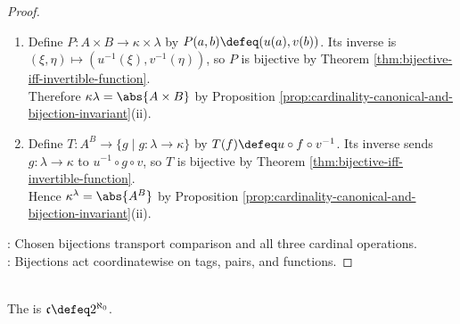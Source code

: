 \begin{proposition}
\begin{proof}
\begin{enumerate}[label=(\roman*)]
Hence $\abs{U}=\abs{V}$ by Proposition \ref{prop:cardinality-canonical-and-bijection-invariant}(ii), proving the first equality.\\
If $A\cap B=\emptyset$, define $G:U\to A\cup B$ by $G(0,a)\defeq a$ and $G(1,b)\defeq b$.\\
Its inverse sends $x\in A$ to $(0,x)$ and $x\in B$ to $(1,x)$, so $G$ is bijective. Thus $\kappa+\lambda=\abs{A\cup B}$ by Proposition \ref{prop:cardinality-canonical-and-bijection-invariant}(ii).
\item[$(iv)$] Define $P:A\times B\to\kappa\times\lambda$ by $P(a,b)\defeq(u(a),v(b))$. Its inverse is $(\xi,\eta)\mapsto(u^{-1}(\xi),v^{-1}(\eta))$, so $P$ is bijective by Theorem \ref{thm:bijective-iff-invertible-function}.\\
Therefore $\kappa\lambda=\abs{A\times B}$ by Proposition \ref{prop:cardinality-canonical-and-bijection-invariant}(ii).
\item[$(v)$] Define $T:A^B\to\{g\mid g:\lambda\to\kappa\}$ by $T(f)\defeq u\circ f\circ v^{-1}$. Its inverse sends $g:\lambda\to\kappa$ to $u^{-1}\circ g\circ v$, so $T$ is bijective by Theorem \ref{thm:bijective-iff-invertible-function}.\\
Hence $\kappa^\lambda=\abs{A^B}$ by Proposition \ref{prop:cardinality-canonical-and-bijection-invariant}(ii).
\end{enumerate}
: Chosen bijections transport comparison and all three cardinal operations.\\
: Bijections act coordinatewise on tags, pairs, and functions.
\end{proof}
\end{proposition}

\begin{definition} \label{def:continuum-cardinal} \\
The  is $\mathfrak{c}\defeq2^{\aleph_0}$.
\end{definition}

